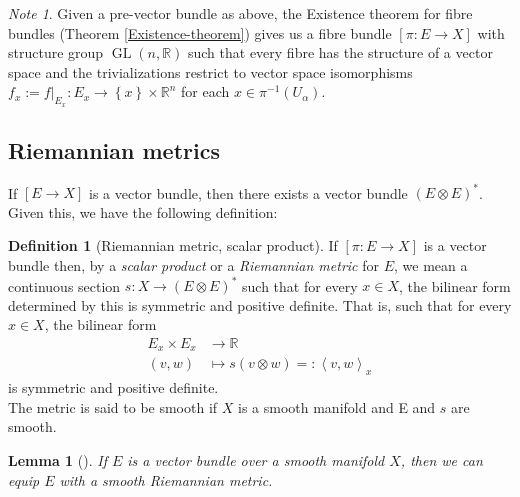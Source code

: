 \documentclass[reqno]{amsart}
\newtheorem{lemma}[theorem]{Lemma}
\theoremstyle{definition}
\newtheorem{definition}[theorem]{Definition}
\theoremstyle{remark}
\newtheorem*{note}{Note}
\DeclareMathOperator{\GL}{GL}
\begin{document}
    \begin{note}
        Given a pre-vector bundle as above, the Existence theorem
        for fibre bundles (Theorem \ref{Existence-theorem})
        gives us a fibre bundle
        $\left[ \pi \colon E \to X \right] $ with
        structure group
        $\GL \left( n, \mathbb{R} \right) $ such that
        every fibre has the structure of a vector space
        and the trivializations restrict to
        vector space isomorphisms
        $f_x := f|_{E_x} \colon
        E_x \to \left\{ x \right\} \times \mathbb{R}^{n}$ 
        for each $x \in 
        \pi^{-1}\left( U_{\alpha} \right) $.
    \end{note}

    \subsection{Riemannian metrics}

    If $\left[ E \to X \right] $ is a vector bundle, then
    there exists a vector bundle
    $\left( E \otimes E \right)^{*}$. Given this, we have
    the following definition:
    \begin{definition}[Riemannian metric, scalar product]
        If $\left[ \pi \colon E \to X \right] $ is
        a vector bundle then, by a \textit{scalar product} or
        a \textit{Riemannian metric} for $E$, we 
        mean a continuous section
        $s \colon X \to \left( E \otimes E \right)^{*}$ 
        such that for every $x \in X$, the
        bilinear form determined by
        this is symmetric and positive definite. That is,
        such that for every $x \in X$, the bilinear form
        \begin{align*}
            E_x \times E_x &\to \mathbb{R}\\
            \left( v,w \right) &\mapsto 
            s \left( v \otimes w \right) 
            =: \left<v,w \right>_x
        \end{align*}
        is symmetric and positive definite.\\
        The metric is said to be smooth if
        $X$ is a smooth manifold and
        E and $s$ are smooth.
    \end{definition}

    \begin{lemma}[]
        If $E$ is a vector bundle over a smooth manifold
        $X$, then
        we can equip $E$ with a smooth Riemannian metric.
    \end{lemma}
\end{document}

